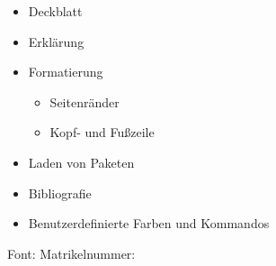 \documentclass{scrartcl}
\begin{document}
    
    \dhbwtitlepage
    
    \dhbwdeclaration
    
    \begin{itemize}
        \item Deckblatt
        \item Erklärung
        \item Formatierung
        \begin{itemize}
            \item Seitenränder
            \item Kopf- und Fußzeile
        \end{itemize}
        \item Laden von Paketen
        \item Bibliografie
        \item Benutzerdefinierte Farben und Kommandos
    \end{itemize}

Font: \testfont
Matrikelnummer: \testmatrikel
\end{document}
